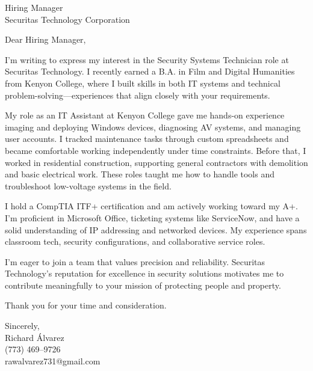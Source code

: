 \documentclass[a4paper,10pt]{letter}
\begin{document}
\begin{letter}{Hiring Manager\\Securitas Technology Corporation}

\opening{Dear Hiring Manager,}

I’m writing to express my interest in the Security Systems Technician role at Securitas Technology. I recently earned a B.A. in Film and Digital Humanities from Kenyon College, where I built skills in both IT systems and technical problem-solving—experiences that align closely with your requirements.

My role as an IT Assistant at Kenyon College gave me hands-on experience imaging and deploying Windows devices, diagnosing AV systems, and managing user accounts. I tracked maintenance tasks through custom spreadsheets and became comfortable working independently under time constraints. Before that, I worked in residential construction, supporting general contractors with demolition and basic electrical work. These roles taught me how to handle tools and troubleshoot low-voltage systems in the field.

I hold a CompTIA ITF+ certification and am actively working toward my A+. I'm proficient in Microsoft Office, ticketing systems like ServiceNow, and have a solid understanding of IP addressing and networked devices. My experience spans classroom tech, security configurations, and collaborative service roles.

I’m eager to join a team that values precision and reliability. Securitas Technology’s reputation for excellence in security solutions motivates me to contribute meaningfully to your mission of protecting people and property.

Thank you for your time and consideration.

\closing{Sincerely,\\
Richard Álvarez\\
(773) 469–9726\\
rawalvarez731@gmail.com}

\end{letter}
\end{document}
